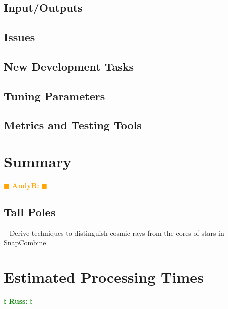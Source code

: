 \documentclass[12pt]{article}
\newcommand{\becker} { \textcolor{orange} {
\ensuremath{\blacksquare} {\bf AndyB:}  
\ensuremath{\blacksquare} } }
\newcommand{\russ} { \textcolor{green} {
\ensuremath{\natural} {\bf Russ:}  
\ensuremath{\natural} } }
\begin{document}
\subsection{Input/Outputs}
\subsection{Issues}
\subsection{New Development Tasks}
\subsection{Tuning Parameters}
\subsection{Metrics and Testing Tools}


\clearpage 
\section{Summary} \becker

\subsection{Tall Poles}

-- Derive techniques to distinguish cosmic rays from the cores of stars in SnapCombine



\clearpage 
\section{Estimated Processing Times} \russ
\end{document}
